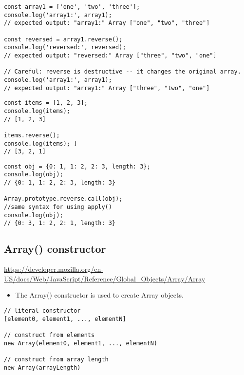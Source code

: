 \documentclass[10pt]{article}
\begin{document}
\begin{lstlisting}[title=Example using reverse(), captionpos=t]
const array1 = ['one', 'two', 'three'];
console.log('array1:', array1);
// expected output: "array1:" Array ["one", "two", "three"]

const reversed = array1.reverse();
console.log('reversed:', reversed);
// expected output: "reversed:" Array ["three", "two", "one"]

// Careful: reverse is destructive -- it changes the original array.
console.log('array1:', array1);
// expected output: "array1:" Array ["three", "two", "one"]

\end{lstlisting}

\begin{lstlisting}[title=Example using reverse() with array, captionpos=t]
const items = [1, 2, 3];
console.log(items);
// [1, 2, 3]

items.reverse();
console.log(items); ]
// [3, 2, 1]
\end{lstlisting}

\begin{lstlisting}[title=Example using reverse() in array like object, captionpos=t]
const obj = {0: 1, 1: 2, 2: 3, length: 3};
console.log(obj); 
// {0: 1, 1: 2, 2: 3, length: 3}

Array.prototype.reverse.call(obj); 
//same syntax for using apply()
console.log(obj); 
// {0: 3, 1: 2, 2: 1, length: 3}
\end{lstlisting}
\medskip %










\medskip %
\pagebreak
\subsection{Array() constructor}

\url{https://developer.mozilla.org/en-US/docs/Web/JavaScript/Reference/Global_Objects/Array/Array}

\begin{itemize}
	\item The Array() constructor is used to create Array objects.
\end{itemize}

\begin{lstlisting}[title=Example Array() constructor, captionpos=t]
// literal constructor
[element0, element1, ..., elementN]

// construct from elements
new Array(element0, element1, ..., elementN)

// construct from array length
new Array(arrayLength)
\end{lstlisting}
\end{document}
